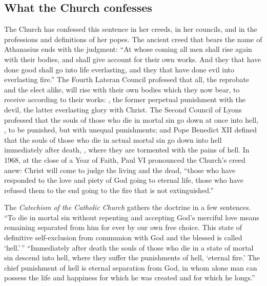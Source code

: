 \subsection{What the Church confesses}

The Church has confessed this sentence in her creeds, in her councils, and in the professions and definitions of her popes. The ancient creed that bears the name of Athanasius ends with the judgment: ``At whose coming all men shall rise again with their bodies, and shall give account for their own works. And they that have done good shall go into life everlasting, and they that have done evil into everlasting fire.'' The Fourth Lateran Council professed that all, the reprobate and the elect alike, will rise with their own bodies which they now bear, to receive according to their works: , the former perpetual punishment with the devil, the latter everlasting glory with Christ. The Second Council of Lyons professed that the souls of those who die in mortal sin go down at once into hell, , to be punished, but with unequal punishments; and Pope Benedict XII defined that the souls of those who die in actual mortal sin go down into hell immediately after death, , where they are tormented with the pains of hell. In 1968, at the close of a Year of Faith, Paul VI pronounced the Church's creed anew: Christ will come to judge the living and the dead, ``those who have responded to the love and piety of God going to eternal life, those who have refused them to the end going to the fire that is not extinguished.''

The \emph{Catechism of the Catholic Church} gathers the doctrine in a few sentences. ``To die in mortal sin without repenting and accepting God's merciful love means remaining separated from him for ever by our own free choice. This state of definitive self-exclusion from communion with God and the blessed is called `hell.'\,'' ``Immediately after death the souls of those who die in a state of mortal sin descend into hell, where they suffer the punishments of hell, `eternal fire.' The chief punishment of hell is eternal separation from God, in whom alone man can possess the life and happiness for which he was created and for which he longs.''

